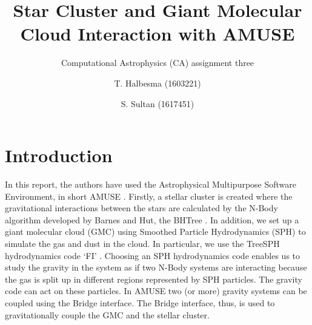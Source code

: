 \documentclass{aa}
\begin{document}
   \title{Star Cluster and Giant Molecular Cloud Interaction with AMUSE}

   \subtitle{Computational Astrophysics (CA) assignment three}

   \author{T. Halbesma (1603221)
          \and
          S. Sultan (1617451)
          }




  \abstract
   {}
   {}
   {}
   {}
   {}


   \maketitle
%

\section{Introduction}
In this report, the authors have used the Astrophysical Multipurpose Software Environment, in short AMUSE \citep{2009NewA...14..369P, 2013CoPhC.183..456P, 2013A&A...557A..84P}. Firstly, a stellar cluster is created where the gravitational interactions between the stars are calculated by the N-Body algorithm developed by Barnes and Hut, the BHTree \cite{1986Natur.324..446B}. In addition, we set up a giant molecular cloud (GMC) using Smoothed Particle Hydrodynamics (SPH) \citep{1977MNRAS.181..375G} to simulate the gas and dust in the cloud. In particular, we use the TreeSPH hydrodynamics code `FI' \citep{1989ApJS...70..419H, 1997A&A...325..972G, 2004A&A...422...55P, 2005PhDT........17P}. Choosing an SPH hydrodynamics code enables us to study the gravity in the system as if two N-Body systems are interacting because the gas is split up in different regions represented by SPH particles. The gravity code can act on these particles. In AMUSE two (or more) gravity systems can be coupled using the Bridge interface. The Bridge interface, thus, is used to gravitationally couple the GMC and the stellar cluster.
\end{document}
